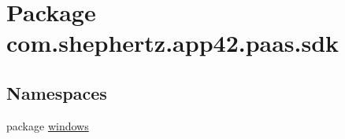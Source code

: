 \hypertarget{namespacecom_1_1shephertz_1_1app42_1_1paas_1_1sdk}{\section{Package com.\+shephertz.\+app42.\+paas.\+sdk}
\label{namespacecom_1_1shephertz_1_1app42_1_1paas_1_1sdk}
}
\subsection*{Namespaces}
\begin{DoxyCompactItemize}
\item 
package \hyperlink{namespacecom_1_1shephertz_1_1app42_1_1paas_1_1sdk_1_1windows}{windows}
\end{DoxyCompactItemize}
